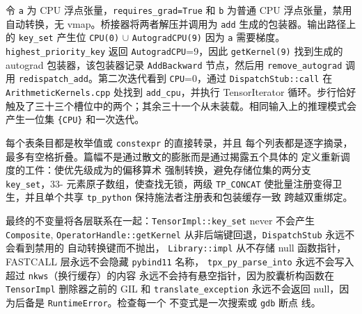 \begin{tpexample}
令 \texttt{a} 为 CPU 浮点张量，\texttt{requires\_grad=True} 和 \texttt{b} 为普通 CPU 浮点张量，禁用自动转换，无 vmap。桥接器将两者解压并调用为 \texttt{add} 生成的包装器。输出路径上的 \texttt{key\_set} 产生位 \texttt{CPU(0)} $\cup$ \texttt{AutogradCPU(9)} 因为 \texttt{a} 需要梯度。 \texttt{highest\_priority\_key} 返回 \texttt{AutogradCPU}=9，因此 \texttt{getKernel(9)} 找到生成的 autograd 包装器，该包装器记录 \texttt{AddBackward} 节点，然后用 \texttt{remove\_autograd} 调用 \texttt{redispatch\_add}。第二次迭代看到 \texttt{CPU}=0，通过 \texttt{DispatchStub::call} 在 \texttt{ArithmeticKernels.cpp} 处找到 \texttt{add\_cpu}，并执行 TensorIterator 循环。步行恰好触及了三十三个槽位中的两个；其余三十一个从未装载。相同输入上的推理模式会产生一位集 \texttt{\{CPU\}} 和一次迭代。
\end{tpexample}
每个表条目都是枚举值或 \texttt{constexpr} 的直接转录，并且
每个列表都是逐字摘录，最多有空格折叠。篇幅不是通过散文的膨胀而是通过揭露五个具体的
定义重新调度的工件：使优先级成为的偏移算术
强制转换，避免存储位集的两分支 \texttt{key\_set}，33-
元素原子数组，使查找无锁，两级
\texttt{TP\_CONCAT} 使批量注册变得卫生，并且单个共享
\texttt{tp\_python} 保持施法者注册表和包装缓存一致
跨越双重绑定。

最终的不变量将各层联系在一起：\texttt{TensorImpl::key\_set} never
不会产生 \texttt{Composite}, \texttt{OperatorHandle::getKernel}
从非后端键回退，\texttt{DispatchStub} 永远不会看到禁用的
自动转换键而不抛出， \texttt{Library::impl} 从不存储 null
函数指针，FASTCALL 层永远不会隐藏 \texttt{pybind11} 名称，
\texttt{tpx\_py\_parse\_into} 永远不会写入超过 \texttt{nkws}（换行缓存）的内容
永远不会持有悬空指针，因为胶囊析构函数在
\texttt{TensorImpl} 删除器之前的 GIL 和 \texttt{translate\_exception}
永远不会返回 null，因为后备是 \texttt{RuntimeError}。检查每一个
不变式是一次搜索或 \texttt{gdb} 断点
线。


